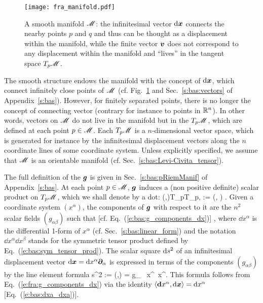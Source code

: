 \begin{figure}
\centerline{\texttt{[image: fra\_manifold.pdf]}}
\caption[]{\label{f:fra:manifold} \footnotesize
A smooth manifold $\mathscr{M}$: the infinitesimal vector $\mathrm{d}\bm{x}$ connects the nearby points $p$ and $q$ and thus
can be thought as a displacement within the manifold, while the finite vector $\bm{v}$ does not correspond to
any displacement within the manifold and ``lives'' in the tangent space $T_p\mathscr{M}$.}
\end{figure}


The smooth structure endows the manifold
with the concept of  $\mathrm{d}\bm{x}$, which connect infinitely
close points of $\mathscr{M}$ (cf. Fig.~\ref{f:fra:manifold} and Sec.~\ref{s:bas:vectors} of Appendix~\ref{s:bas}). However, for finitely separated points, there is no
longer the concept of connecting vector (contrary for instance to points in $\mathbb{R}^n$).
In other words, vectors on $\mathscr{M}$ do not live in the manifold but in the
 $T_p\mathscr{M}$, which are defined at each point $p\in\mathscr{M}$. Each  $T_p\mathscr{M}$
is a $n$-dimensional vector space, which is generated for instance by the infinitesimal displacement
vectors along the $n$ coordinate lines of some coordinate system.
Unless explicitly specified, we assume that $\mathscr{M}$ is an orientable manifold (cf. Sec.~\ref{s:bas:Levi-Civita_tensor}).

The full definition of the  $\bm{g}$ is given in Sec.~\ref{s:bas:pRiemManif} of
Appendix~\ref{s:bas}. At each point $p\in\mathscr{M}$, $\bm{g}$ induces a (non positive definite)
scalar product on $T_p\mathscr{M}$, which we shall denote by a dot:
\be
    \forall (,)\in T_p\M\times T_p\M, \quad
        \cdot{} := (, ) .
\ee
Given a coordinate system $(x^\alpha)$, the components of $\bm{g}$ with respect
to it are the $n^2$ scalar fields $(g_{\alpha\beta})$ such that [cf. Eq.~(\ref{e:bas:g_components_dx})]
\be \label{e:fra:g_components_dx}
    ,
\ee
where $\dd x^\alpha$ is the differential 1-form of $x^\alpha$ (cf. Sec.~\ref{s:bas:linear_form})
and the notation $\dd x^\alpha \dd x^\beta$ stands for the symmetric tensor product
defined by Eq.~(\ref{e:bas:sym_tensor_prod}).
The scalar square $\mathrm{d} s^2$ of an infinitesimal
displacement vector $\mathrm{d}\bm{x} = \mathrm{d} x^\alpha \bm{\partial}_\alpha$ is expressed in
terms of the components $(g_{\alpha\beta})$ by the line element
formula
\be \label{e:fra:line_element}
    \D s^2 := (\D{},\D{}) = g_{\alpha\beta} \, \D x^\alpha \, \D x^\beta .
\ee
This formula follows from Eq.~(\ref{e:fra:g_components_dx}) via the identity
$\langle\mathbf{d} x^\alpha,\mathrm{d}\bm{x} \rangle =  \mathrm{d} x^\alpha$ [Eq.~(\ref{e:bas:dxa_dxa})].

